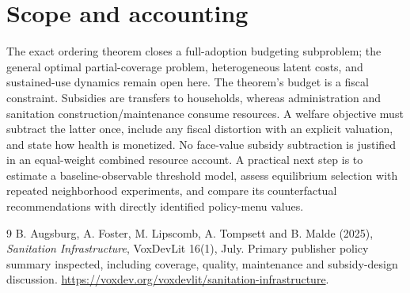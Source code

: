 \documentclass[11pt]{article}
\begin{document}
\section{Scope and accounting}
The exact ordering theorem closes a full-adoption budgeting subproblem;
the general optimal partial-coverage problem, heterogeneous latent costs,
and sustained-use dynamics remain open here. The theorem's budget is a
fiscal constraint. Subsidies are transfers to households, whereas
administration and sanitation construction/maintenance consume resources.
A welfare objective must subtract the latter once, include any fiscal
distortion with an explicit valuation, and state how health is monetized.
No face-value subsidy subtraction is justified in an equal-weight combined
resource account. A practical next step is to estimate a baseline-observable
threshold model, assess equilibrium selection with repeated neighborhood
experiments, and compare its counterfactual recommendations with directly
identified policy-menu values.

\begin{thebibliography}{9}
 B. Augsburg, A. Foster, M. Lipscomb, A. Tompsett and B. Malde
(2025), \emph{Sanitation Infrastructure}, VoxDevLit 16(1), July.
Primary publisher policy summary inspected, including coverage, quality,
maintenance and subsidy-design discussion.
\url{https://voxdev.org/voxdevlit/sanitation-infrastructure}.
\end{thebibliography}
\end{document}
